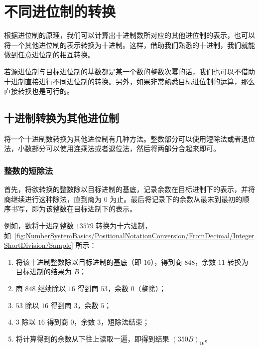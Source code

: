 \section{不同进位制的转换}\label{sec:NumberSystemBasics/PositionalNotationConversion}
    根据进位制的原理，我们可以计算出十进制数所对应的其他进位制的表示，也可以将一个其他进位制的表示转换为十进制。这样，借助我们熟悉的十进制，我们就能做到任意进位制的相互转换。

    若源进位制与目标进位制的基数都是某一个数的整数次幂的话，我们也可以不借助十进制直接进行不同进位制的转换。另外，如果非常熟悉目标进位制的运算，那么直接转换也是可行的。

    \subsection{十进制转换为其他进位制}\label{subsec:NumberSystemBasics/PositionalNotationConversion/FromDecimal}
        将一个十进制数转换为其他进位制有几种方法。整数部分可以使用短除法或者退位法，小数部分可以使用连乘法或者退位法，然后将两部分合起来即可。

        \subsubsection{整数的短除法}\label{subsubsec:NumberSystemBasics/PositionalNotationConversion/FromDecimal/IntegerShortDivision}
            首先，将欲转换的整数除以目标进制的基底，记录余数在目标进制下的表示，并将商继续进行这种除法，直到商为 0 为止。最后将记录下的余数从最末到最初的顺序书写，即为该整数在目标进制下的表示。

            例如，欲将十进制整数 $13579$ 转换为十六进制，如~\ref{fig:NumberSystemBasics/PositionalNotationConversion/FromDecimal/IntegerShortDivision/Sample} 所示：

            \begin{enumerate}
                \item 将该十进制整数除以目标进制的基底（即 $16$），得到商 $848$，余数 $11$ 转换为目标进制的结果为 $B$；
                \item 商 $848$ 继续除以 $16$ 得到商 $53$，余数 $0$（整除）；
                \item $53$ 除以 $16$ 得到商 $3$，余数 $5$；
                \item $3$ 除以 $16$ 得到商 $0$，余数 $3$，短除法结束；
                \item 将计算得到的余数从下往上读取一遍，即得到结果 $(350B)_{16}$。
            \end{enumerate}

